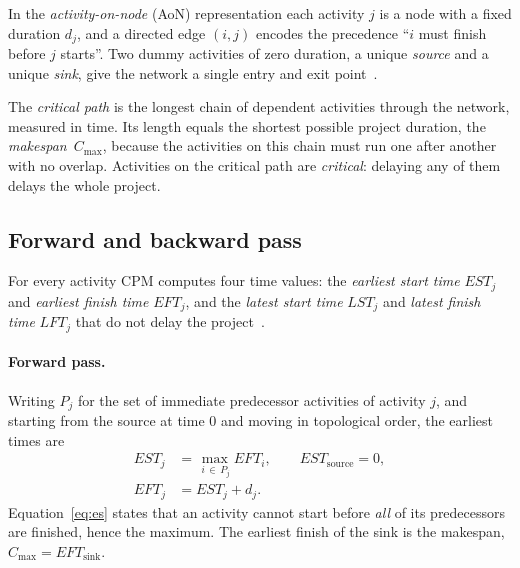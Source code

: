 In the \emph{activity-on-node} (AoN) representation each activity $j$ is a node
with a fixed duration $d_j$, and a directed edge $(i,j)$ encodes the precedence
``$i$ must finish before $j$ starts''. Two dummy activities of zero duration, a
unique \emph{source} and a unique \emph{sink}, give the network a single entry
and exit point~\cite{demeulemeester2002}.

The \emph{critical path} is the longest chain of dependent activities through
the network, measured in time. Its length equals the shortest possible project
duration, the \emph{makespan}~$C_{\max}$, because the activities on this chain
must run one after another with no overlap.  Activities on
the critical path are \emph{critical}: delaying any of them delays the whole
project.

\subsection{Forward and backward pass}
\label{subsec:passes}

For every activity CPM computes four time values: the \emph{earliest start
time} $EST_j$ and \emph{earliest finish time} $EFT_j$, and the \emph{latest
start time} $LST_j$ and \emph{latest finish time} $LFT_j$ that do not delay the
project~\cite{demeulemeester2002}.

\paragraph{Forward pass.}
Writing $P_j$ for the set of immediate predecessor activities of activity $j$,
and starting from the source at time $0$ and moving in topological order, the
earliest times are
\begin{align}
  EST_j &= \max_{\,i \,\in\, P_j} EFT_i,
         \qquad EST_{\text{source}} = 0, \label{eq:es}\\[2pt]
  EFT_j &= EST_j + d_j. \label{eq:ef}
\end{align}
Equation~\eqref{eq:es} states that an activity cannot start before \emph{all} of
its predecessors are finished, hence the maximum. The earliest finish of the
sink is the makespan, $C_{\max} = EFT_{\text{sink}}$.

